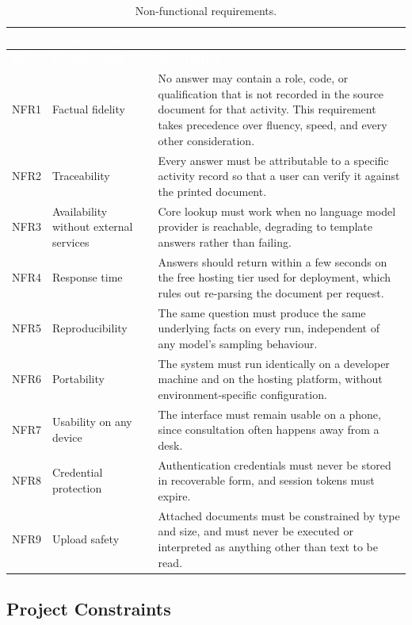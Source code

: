 \begin{longtable}{|p{}|p{}|p{}|}
\caption{Non-functional requirements.}\label{tab:nfr}\\
\hline
\rowcolor{myblue}\textcolor{white}{\textbf{Ref.}} & \textcolor{white}{\textbf{Requirement}} & \textcolor{white}{\textbf{Description}} \\
\hline
\endfirsthead
\hline
\rowcolor{myblue}\textcolor{white}{\textbf{Ref.}} & \textcolor{white}{\textbf{Requirement}} & \textcolor{white}{\textbf{Description}} \\
\hline
\endhead
NFR1 & Factual fidelity & No answer may contain a role, code, or qualification that is not recorded in the source document for that activity. This requirement takes precedence over fluency, speed, and every other consideration. \\ \hline
NFR2 & Traceability & Every answer must be attributable to a specific activity record so that a user can verify it against the printed document. \\ \hline
NFR3 & Availability without external services & Core lookup must work when no language model provider is reachable, degrading to template answers rather than failing. \\ \hline
NFR4 & Response time & Answers should return within a few seconds on the free hosting tier used for deployment, which rules out re-parsing the document per request. \\ \hline
NFR5 & Reproducibility & The same question must produce the same underlying facts on every run, independent of any model's sampling behaviour. \\ \hline
NFR6 & Portability & The system must run identically on a developer machine and on the hosting platform, without environment-specific configuration. \\ \hline
NFR7 & Usability on any device & The interface must remain usable on a phone, since consultation often happens away from a desk. \\ \hline
NFR8 & Credential protection & Authentication credentials must never be stored in recoverable form, and session tokens must expire. \\ \hline
NFR9 & Upload safety & Attached documents must be constrained by type and size, and must never be executed or interpreted as anything other than text to be read. \\ \hline
\end{longtable}

\subsection{Project Constraints}

